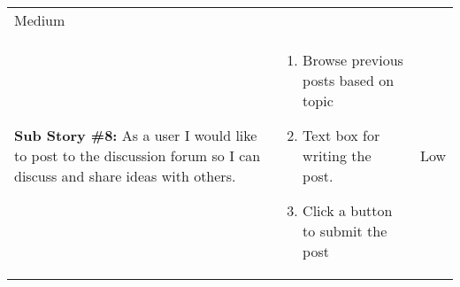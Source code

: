 \documentclass[portfolio.tex.tex]{subfiles}
\begin{document}
\begin{tabular}{p{6cm}|p{6cm}|p{4cm}}
						\vspace{-1cm}\color{orange}Medium\\

						\textbf{Sub Story \#8:} As a user I would like to post to the discussion forum so I can discuss and share ideas with others.  &
						\vspace{-0.8cm}
						\begin{enumerate}
							\item 	Browse previous posts based on topic
							\item 	Text box for writing the post.
							\item 	Click a button to submit the post
						\end{enumerate}&

						\vspace{-1cm}\color{blue}Low\\

					\end{tabular}
\end{document}
